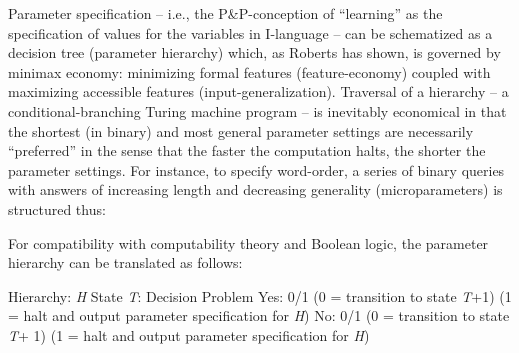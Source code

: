 \documentclass[output=paper]{langsci/langscibook}
\begin{document}
Parameter specification – i.e., the P\&P-conception of “learning”
as the specification of values for the variables in I-language – can be
schematized as a decision tree (parameter hierarchy) which, as Roberts has
shown, is governed by minimax economy: minimizing formal features
(feature-economy) coupled with maximizing accessible features
(input-generalization). Traversal of a hierarchy – a conditional-branching
Turing machine program – is inevitably economical in that the shortest (in
binary) and most general parameter settings are necessarily “preferred” in the
sense that the faster the computation halts, the shorter the parameter
settings. For instance, to specify word-order, a series of binary queries with
answers of increasing length and decreasing generality (microparameters) is
structured thus:

\begin{figure}


\end{figure}

For compatibility with computability theory and Boolean logic, the parameter
hierarchy can be translated as follows:

\ea Hierarchy: \emph{H}
    \sn State \emph{T}: Decision Problem
    \sn Yes: 0/1 (0 = transition to state \emph{T}+1) (1 = halt and output parameter specification for \emph{H})
    \sn No: 0/1 (0 = transition to state \emph{T}+ 1) (1 = halt and output parameter specification for \emph{H})
\z
\end{document}
